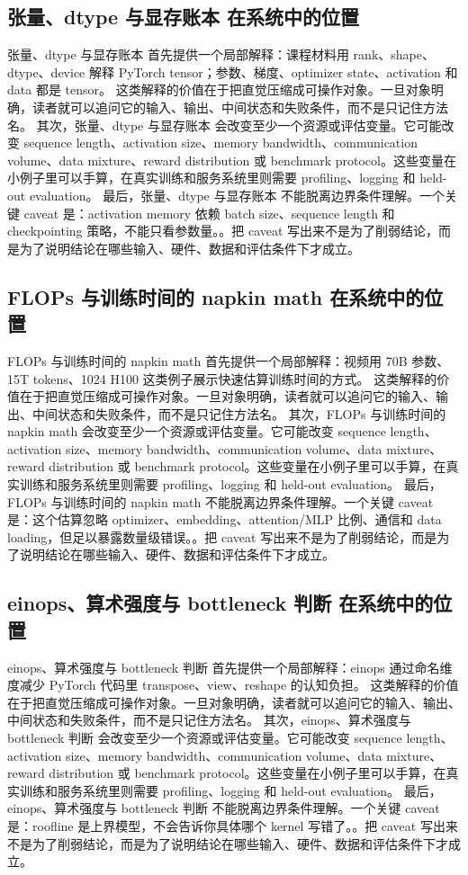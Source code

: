\documentclass[a4paper]{article}
\begin{document}
\subsection{张量、dtype 与显存账本 在系统中的位置}
张量、dtype 与显存账本 首先提供一个局部解释：课程材料用 rank、shape、dtype、device 解释 PyTorch tensor；参数、梯度、optimizer state、activation 和 data 都是 tensor。 这类解释的价值在于把直觉压缩成可操作对象。一旦对象明确，读者就可以追问它的输入、输出、中间状态和失败条件，而不是只记住方法名。
其次，张量、dtype 与显存账本 会改变至少一个资源或评估变量。它可能改变 sequence length、activation size、memory bandwidth、communication volume、data mixture、reward distribution 或 benchmark protocol。这些变量在小例子里可以手算，在真实训练和服务系统里则需要 profiling、logging 和 held-out evaluation。
最后，张量、dtype 与显存账本 不能脱离边界条件理解。一个关键 caveat 是：activation memory 依赖 batch size、sequence length 和 checkpointing 策略，不能只看参数量。。把 caveat 写出来不是为了削弱结论，而是为了说明结论在哪些输入、硬件、数据和评估条件下才成立。
\subsection{FLOPs 与训练时间的 napkin math 在系统中的位置}
FLOPs 与训练时间的 napkin math 首先提供一个局部解释：视频用 70B 参数、15T tokens、1024 H100 这类例子展示快速估算训练时间的方式。 这类解释的价值在于把直觉压缩成可操作对象。一旦对象明确，读者就可以追问它的输入、输出、中间状态和失败条件，而不是只记住方法名。
其次，FLOPs 与训练时间的 napkin math 会改变至少一个资源或评估变量。它可能改变 sequence length、activation size、memory bandwidth、communication volume、data mixture、reward distribution 或 benchmark protocol。这些变量在小例子里可以手算，在真实训练和服务系统里则需要 profiling、logging 和 held-out evaluation。
最后，FLOPs 与训练时间的 napkin math 不能脱离边界条件理解。一个关键 caveat 是：这个估算忽略 optimizer、embedding、attention/MLP 比例、通信和 data loading，但足以暴露数量级错误。。把 caveat 写出来不是为了削弱结论，而是为了说明结论在哪些输入、硬件、数据和评估条件下才成立。
\subsection{einops、算术强度与 bottleneck 判断 在系统中的位置}
einops、算术强度与 bottleneck 判断 首先提供一个局部解释：einops 通过命名维度减少 PyTorch 代码里 transpose、view、reshape 的认知负担。 这类解释的价值在于把直觉压缩成可操作对象。一旦对象明确，读者就可以追问它的输入、输出、中间状态和失败条件，而不是只记住方法名。
其次，einops、算术强度与 bottleneck 判断 会改变至少一个资源或评估变量。它可能改变 sequence length、activation size、memory bandwidth、communication volume、data mixture、reward distribution 或 benchmark protocol。这些变量在小例子里可以手算，在真实训练和服务系统里则需要 profiling、logging 和 held-out evaluation。
最后，einops、算术强度与 bottleneck 判断 不能脱离边界条件理解。一个关键 caveat 是：roofline 是上界模型，不会告诉你具体哪个 kernel 写错了。。把 caveat 写出来不是为了削弱结论，而是为了说明结论在哪些输入、硬件、数据和评估条件下才成立。
\end{document}
